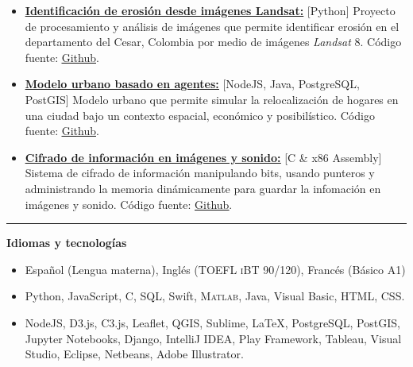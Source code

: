 \documentclass[10pt]{article}
\begin{document}
{{\begin{itemize}
\item \textcolor{blue}{\href{https://github.com/mvanegas10/ErosionIdentificationFromLandsatImages}{\underline{\textbf{Identificación de erosión desde imágenes Landsat:}}}} [Python] Proyecto de procesamiento y análisis de imágenes que permite identificar erosión en el departamento del Cesar, Colombia por medio de imágenes \textit{Landsat} 8. Código fuente: \textcolor{blue}{\href{https://github.com/mvanegas10/ErosionIdentificationFromLandsatImages}{\underline{Github}}}.

\item \textcolor{blue}{\href{https://github.com/mvanegas10/kobdig-validation}{\underline{\textbf{Modelo urbano basado en agentes:}}}} [NodeJS, Java, PostgreSQL, PostGIS]  Modelo urbano que permite simular la relocalización de hogares en una ciudad bajo un contexto espacial, económico y posibilístico. Código fuente: \textcolor{blue}{\href{https://github.com/mvanegas10/kobdig-validation}{\underline{Github}}}.

\item \textcolor{blue}{\href{https://github.com/mvanegas10/DataEncryption}{\underline{\textbf{Cifrado de información en imágenes y sonido:}}}} [C \& x86 Assembly] Sistema de cifrado de información manipulando bits, usando punteros y administrando la memoria dinámicamente para guardar la infomación en imágenes y sonido. Código fuente: \textcolor{blue}{\href{https://github.com/mvanegas10/DataEncryption}{\underline{Github}}}.
\end{itemize}}

\vspace{0.25cm}
\hrule
\vspace{0.25cm}
{\large \textbf{Idiomas y tecnologías}}
\vspace{0.25cm}
{\footnotesize
\begin{itemize}
	\item Español (Lengua materna), Inglés (\textsc{TOEFL iBT} 90/120), Francés (Básico A1)
	\item Python, JavaScript, C, SQL, Swift, \textsc{Matlab}, Java, Visual Basic, \textsc{HTML}, \textsc{CSS}.
	\item NodeJS, D3.js, C3.js, Leaflet, QGIS, Sublime, \LaTeX, PostgreSQL, PostGIS, Jupyter Notebooks, Django, IntelliJ IDEA, Play Framework, Tableau, Visual Studio, Eclipse, Netbeans, Adobe Illustrator.
\end{itemize}}

}
\end{document}
